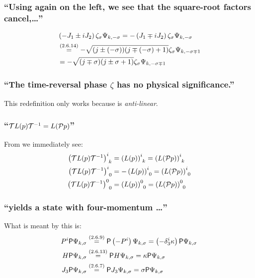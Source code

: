 \subsubsection{\enquote{Using  again on the left, we see that the square-root factors cancel,\dots} }
\begin{align*} 
	&\left(-J_1\pm i J_2\right)\zeta_\sigma \Psi_{k,-\sigma}=-\left(J_1\mp i J_2\right)\zeta_\sigma \Psi_{k,-\sigma}\\
	&\overset{({2.6.14})}{=}-\sqrt{(j\pm (-\sigma))(j\mp(-\sigma)+1)}\zeta_\sigma \Psi_{k,-\sigma\mp 1}\\
	&=-\sqrt{(j\mp\sigma)(j\pm\sigma+1)}\zeta_\sigma \Psi_{k,-\sigma\mp 1}
\end{align*}

\subsubsection{\enquote{The time-reversal phase $\zeta$ has no physical significance.} }
This redefinition only works because \timereversal is \emph{anti-linear}.

\subsubsection{\enquote{$\mathcal{\mathcal{T}} L(p)\mathcal{\mathcal{T}}^{-1}=L(\mathcal{\mathcal{P}} p)$} }
From  we immediately see:
\begin{align*} 
	\left(\mathcal{\mathcal{T}} L(p)\mathcal{\mathcal{T}}^{-1}\right)^i_{\hphantom{i}k}&=\left(L(p)\right)^i_{\hphantom{i}k}
	=\left(L(\mathcal{\mathcal{P}} p)\right)^i_{\hphantom{i}k}\\
	\left(\mathcal{\mathcal{T}} L(p)\mathcal{\mathcal{T}}^{-1}\right)^i_{\hphantom{i}0}&=-\left(L(p)\right)^i_{\hphantom{i}0}
	=\left(L(\mathcal{\mathcal{P}} p)\right)^i_{\hphantom{i}0}\\
	\left(\mathcal{\mathcal{T}} L(p)\mathcal{\mathcal{T}}^{-1}\right)^0_{\hphantom{0}0}&=\left(L(p)\right)^0_{\hphantom{0}0}
	=\left(L(\mathcal{\mathcal{P}} p)\right)^0_{\hphantom{0}0}
\end{align*}

\subsubsection{\enquote{\parity yields a state with four-momentum \dots} }\label{sususec:2_6_p78_1}
What is meant by this is:
\begin{align*} 
	P^i \mathsf{P} \Psi_{k,\sigma}&\overset{({2.6.9})}{=} \mathsf{P} \left(-P^i\right)\Psi_{k,\sigma}=\left(-\delta^i_3\kappa\right)\mathsf{P}\Psi_{k,\sigma}\\
	H \mathsf{P} \Psi_{k,\sigma}&\overset{({2.6.13})}{=} \mathsf{P} H \Psi_{k,\sigma} =\kappa \mathsf{P}\Psi_{k,\sigma}\\
	J_3 \mathsf{P} \Psi_{k,\sigma}&\overset{({2.6.7})}{=} \mathsf{P} J_3 \Psi_{k,\sigma} = \sigma \mathsf{P} \Psi_{k,\sigma}
\end{align*}


